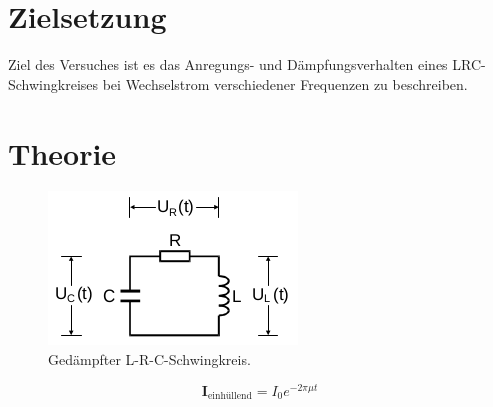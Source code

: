 \section{Zielsetzung}
\label{sec:Zielsetzung}

Ziel des Versuches ist es das Anregungs- und Dämpfungsverhalten eines LRC-Schwingkreises
bei Wechselstrom verschiedener Frequenzen zu beschreiben.


\section{Theorie}
\label{sec:Theorie}

\begin{figure}[H]
  \centering
  \includegraphics{content/images/V354.png}
  \caption{Gedämpfter L-R-C-Schwingkreis.}
  \label{fig:schwingkreis}
\end{figure}

\begin{equation}
  \symbf{I}_\text{einhüllend} = I_0 e^{-2\pi\mu t} 
\end{equation}
